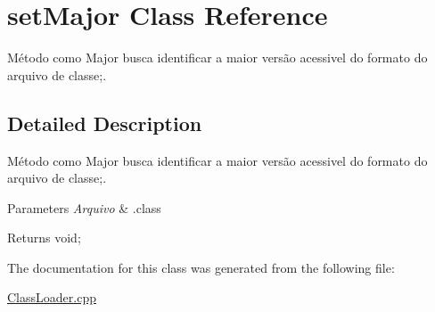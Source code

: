 \hypertarget{classset_major}{}\section{set\+Major Class Reference}
\label{classset_major}


Método como Major busca identificar a maior versão acessivel do formato do arquivo de classe;.  




\subsection{Detailed Description}
Método como Major busca identificar a maior versão acessivel do formato do arquivo de classe;. 


\begin{DoxyParams}{Parameters}
{\em Arquivo} & .class \\
\hline
\end{DoxyParams}
\begin{DoxyReturn}{Returns}
void; 
\end{DoxyReturn}


The documentation for this class was generated from the following file\+:\begin{DoxyCompactItemize}
\item 
\hyperlink{_class_loader_8cpp}{Class\+Loader.\+cpp}\end{DoxyCompactItemize}
